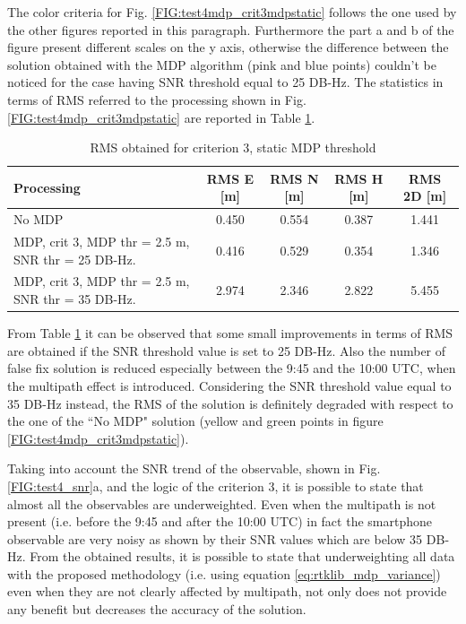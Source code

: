 The color criteria for Fig. \ref{FIG:test4mdp_crit3mdpstatic} follows the one used by the other figures reported in this paragraph. Furthermore the part a and b of the figure present different scales on the y axis, otherwise the difference between the solution obtained with the MDP algorithm (pink and blue points) couldn't be noticed for the case having SNR threshold equal to 25 DB-Hz.
The statistics in terms of RMS referred to the processing shown in Fig. \ref{FIG:test4mdp_crit3mdpstatic} are reported in Table \ref{tab:mdp_crit3_mdp_table}.

\begin{table}[H]
	\centering
	\begin{tabular}{|p{4.5cm}|c|c|c|c|}
	\hline
	\textbf{Processing} & \textbf{RMS E [m]} & \textbf{RMS N [m]} &
	\textbf{RMS H [m]}&
	\textbf{RMS 2D [m]}\\
    \hline
	No MDP & 0.450 & 0.554& 0.387&1.441\\  
    \hline
	 MDP, crit 3, MDP thr = 2.5 m, SNR thr = 25 DB-Hz.& 0.416 & 0.529& 0.354&1.346\\ \hline
	 MDP, crit 3, MDP thr = 2.5 m, SNR thr = 35 DB-Hz.& 2.974 & 2.346& 2.822&5.455\\ \hline
	\end{tabular} 
	\caption{RMS obtained for criterion 3, static MDP threshold}
	\label{tab:mdp_crit3_mdp_table}
\end{table}

From Table \ref{tab:mdp_crit3_mdp_table} it can be observed that some small improvements in terms of RMS are obtained if the SNR threshold value is set to 25 DB-Hz. Also the number of false fix solution is reduced especially between the 9:45 and the 10:00 UTC, when the multipath effect is introduced. Considering the SNR threshold value equal to 35 DB-Hz instead, the RMS of the solution is definitely degraded with respect to the one of the ``No MDP" solution (yellow and green points in figure \ref{FIG:test4mdp_crit3mdpstatic}). 

Taking into account the SNR trend of the observable, shown in Fig. \ref{FIG:test4_snr}a, and the logic of the criterion 3, it is possible to state that almost all the observables are underweighted. Even when the multipath is not present (i.e. before the 9:45 and after the 10:00 UTC) in fact the smartphone observable are very noisy as shown by their SNR values which are below 35 DB-Hz. From the obtained results, it is possible to state that underweighting all data with the proposed methodology (i.e. using equation \ref{eq:rtklib_mdp_variance}) even when they are not clearly affected by multipath, not only does not provide any benefit but  decreases the accuracy of the solution. 

